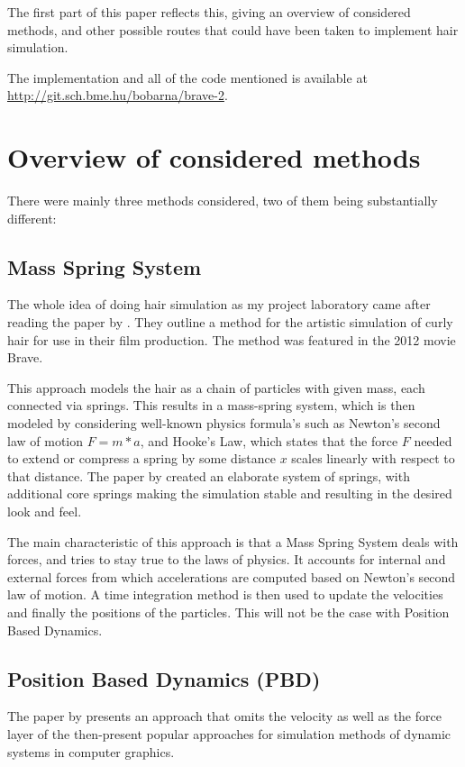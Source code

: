 \documentclass[sigplan,screen,nonacm]{acmart}
\begin{document}
The first part of this paper reflects this, giving an overview of considered
methods, and other possible routes that could have been taken to implement hair
simulation.


The implementation and all of the code mentioned is available at
\url{http://git.sch.bme.hu/bobarna/brave-2}.

\section{Overview of considered methods}

There were mainly three methods considered, two of them being substantially
different:


\subsection{Mass Spring System}
The whole idea of doing hair simulation as my project laboratory came after
reading the paper by \citet{PixarPaper}.  They outline a method for the artistic
simulation of curly hair for use in their film production. The method was
featured in the 2012 movie Brave.

This approach models the hair as a chain of particles with given mass, each
connected via springs. This results in a mass-spring system, which is then
modeled by considering well-known physics formula's such as Newton's second law
of motion $F=m*a$, and Hooke's Law, which states that the force $F$
needed to extend or compress a spring by some distance $x$ scales linearly with
respect to that distance. The paper by \citet{PixarPaper} created an elaborate
system of springs, with additional core springs making the simulation stable
and resulting in the desired look and feel.

The main characteristic of this approach is that a Mass Spring System deals with
forces, and tries to stay true to the laws of physics. It accounts for internal 
and external forces from which accelerations are computed based on Newton's 
second law of motion. A time integration method is then used to update the
velocities and finally the positions of the particles. This will not be the case
with Position Based Dynamics.
\subsection{Position Based Dynamics (PBD)}

The paper by \citet{MullerPBD} presents an approach that omits the velocity as
well as the force layer of the then-present popular approaches for simulation
methods of dynamic systems in computer graphics.
\end{document}

